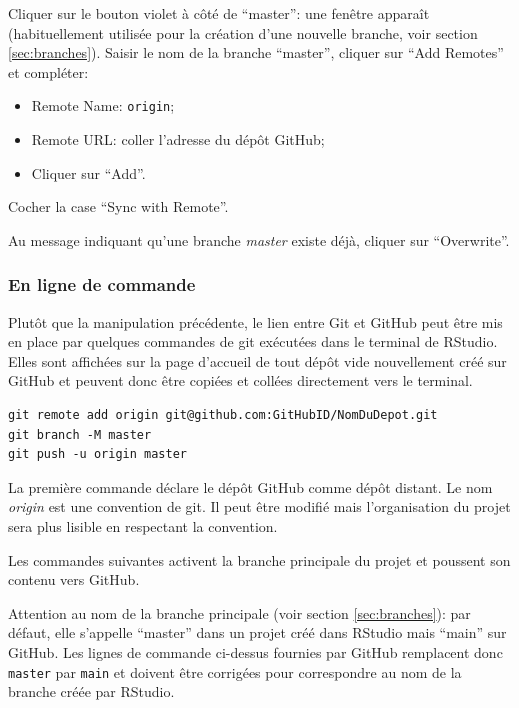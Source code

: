 \documentclass[
  12pt,
  french,
  a4paper,
  extrafontsizes,onecolumn,openright
  ]{memoir}
\providecommand{\tightlist}{%
  \setlength{\itemsep}{0pt}\setlength{\parskip}{0pt}}
\begin{document}
Cliquer sur le bouton violet à côté de \enquote{master}: une fenêtre apparaît (habituellement utilisée pour la création d'une nouvelle branche, voir section \ref{sec:branches}).
Saisir le nom de la branche \enquote{master}, cliquer sur \enquote{Add Remotes} et compléter:

\begin{itemize}
\tightlist
\item
  Remote Name: \texttt{origin};
\item
  Remote URL: coller l'adresse du dépôt GitHub;
\item
  Cliquer sur \enquote{Add}.
\end{itemize}

Cocher la case \enquote{Sync with Remote}.

Au message indiquant qu'une branche \emph{master} existe déjà, cliquer sur \enquote{Overwrite}.

\hypertarget{en-ligne-de-commande}{%
\subsubsection{En ligne de commande}\label{en-ligne-de-commande}}

Plutôt que la manipulation précédente, le lien entre Git et GitHub peut être mis en place par quelques commandes de git exécutées dans le terminal de RStudio.
Elles sont affichées sur la page d'accueil de tout dépôt vide nouvellement créé sur GitHub et peuvent donc être copiées et collées directement vers le terminal.

\begin{verbatim}
git remote add origin git@github.com:GitHubID/NomDuDepot.git
git branch -M master
git push -u origin master
\end{verbatim}

La première commande déclare le dépôt GitHub comme dépôt distant.
Le nom \emph{origin} est une convention de git.
Il peut être modifié mais l'organisation du projet sera plus lisible en respectant la convention.

Les commandes suivantes activent la branche principale du projet et poussent son contenu vers GitHub.

Attention au nom de la branche principale (voir section \ref{sec:branches}): par défaut, elle s'appelle \enquote{master} dans un projet créé dans RStudio mais \enquote{main} sur GitHub.
Les lignes de commande ci-dessus fournies par GitHub remplacent donc \texttt{master} par \texttt{main} et doivent être corrigées pour correspondre au nom de la branche créée par RStudio.
\end{document}
